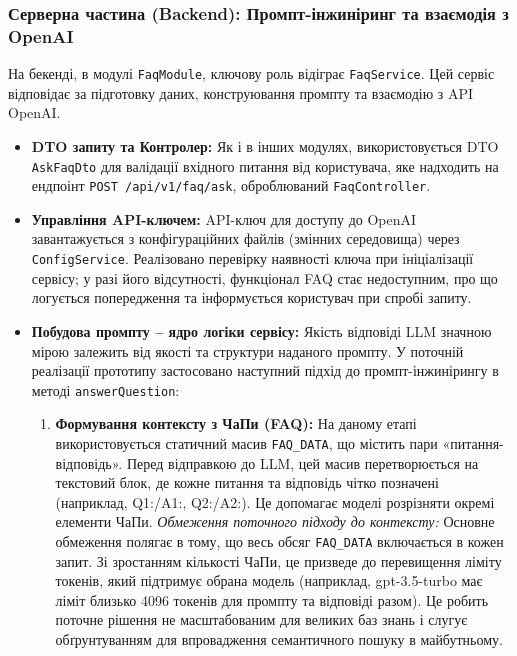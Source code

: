 \subsubsection{Серверна частина (Backend): Промпт-інжиніринг та взаємодія з OpenAI}
На бекенді, в модулі \texttt{FaqModule}, ключову роль відіграє \texttt{FaqService}. Цей сервіс відповідає за підготовку даних, конструювання промпту та взаємодію з API OpenAI.
\begin{itemize}
    \item \textbf{DTO запиту та Контролер:} Як і в інших модулях, використовується DTO \texttt{AskFaqDto} для валідації вхідного питання від користувача, яке надходить на ендпоінт \texttt{POST /api/v1/faq/ask}, оброблюваний \texttt{FaqController}.
    
    \item \textbf{Управління API-ключем:} API-ключ для доступу до OpenAI завантажується з конфігураційних файлів (змінних середовища) через \texttt{ConfigService}. Реалізовано перевірку наявності ключа при ініціалізації сервісу; у разі його відсутності, функціонал FAQ стає недоступним, про що логується попередження та інформується користувач при спробі запиту.

    \item \textbf{Побудова промпту – ядро логіки сервісу:}
    Якість відповіді LLM значною мірою залежить від якості та структури наданого промпту. У поточній реалізації прототипу застосовано наступний підхід до промпт-інжинірингу в методі \texttt{answerQuestion}:
    \begin{enumerate}
        \item \textbf{Формування контексту з ЧаПи (FAQ):} На даному етапі використовується статичний масив \texttt{FAQ\_DATA}, що містить пари «питання-відповідь». Перед відправкою до LLM, цей масив перетворюється на текстовий блок, де кожне питання та відповідь чітко позначені (наприклад, Q1:/A1:, Q2:/A2:). Це допомагає моделі розрізняти окремі елементи ЧаПи. 
        \textit{Обмеження поточного підходу до контексту:} Основне обмеження полягає в тому, що весь обсяг \texttt{FAQ\_DATA} включається в кожен запит. Зі зростанням кількості ЧаПи, це призведе до перевищення ліміту токенів, який підтримує обрана модель (наприклад, gpt-3.5-turbo має ліміт близько 4096 токенів для промпту та відповіді разом). Це робить поточне рішення не масштабованим для великих баз знань і слугує обґрунтуванням для впровадження семантичного пошуку в майбутньому.
        

\end{enumerate}
\end{itemize}
